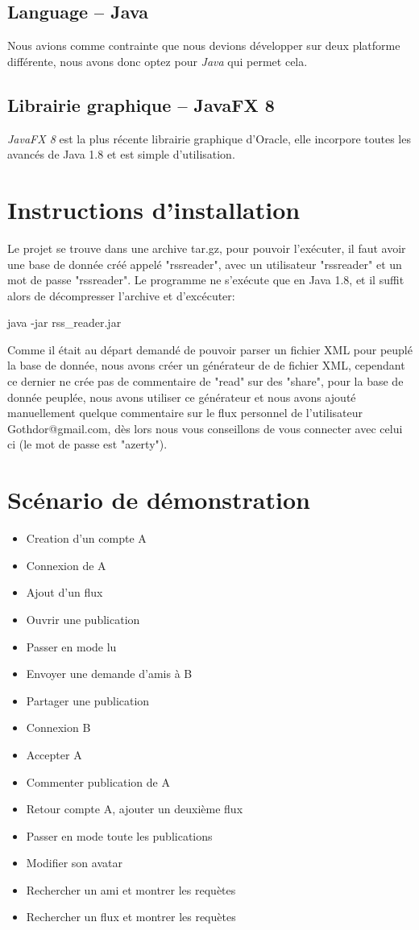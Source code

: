 \documentclass[a4paper,10pt]{article}
\begin{document}
\subsection{Language -- Java}
Nous avions comme contrainte que nous devions développer sur deux platforme différente, nous avons donc optez pour \emph{Java} qui permet cela.
\subsection{Librairie graphique -- JavaFX 8}
\emph{JavaFX 8} est la plus récente librairie graphique d'Oracle, elle incorpore toutes les avancés de Java 1.8 et est simple d'utilisation.
		
\section{Instructions d'installation}

Le projet se trouve dans une archive tar.gz, pour pouvoir l'exécuter, il faut avoir une base de donnée créé appelé "rssreader", avec un utilisateur "rssreader" et un mot de passe "rssreader". Le programme ne s'exécute que en Java 1.8, et il suffit alors de décompresser l'archive et d'excécuter:
\begin{center}
 java -jar rss\_reader.jar
\end{center}


Comme il était au départ demandé de pouvoir parser un fichier XML pour peuplé la base de donnée, nous avons créer un générateur de de fichier XML, cependant ce dernier ne crée pas de commentaire de "read" sur des "share", pour la base de donnée peuplée, nous avons utiliser ce générateur et nous avons ajouté manuellement quelque commentaire sur le flux personnel de l'utilisateur Gothdor@gmail.com, dès lors nous vous conseillons de vous connecter avec celui ci (le mot de passe est "azerty").
		
\section{Scénario de démonstration}
\begin{itemize}
\item Creation d'un compte A
\item Connexion de A
\item Ajout d'un flux
\item Ouvrir une publication
\item Passer en mode lu
\item Envoyer une demande d'amis à B
\item Partager une publication
\item Connexion B
\item Accepter A
\item Commenter publication de A
\item Retour compte A, ajouter un deuxième flux
\item Passer en mode toute les publications
\item Modifier son avatar
\item Rechercher un ami et montrer les requètes
\item Rechercher un flux et montrer les requètes
\end{itemize}
		
\end{document}
